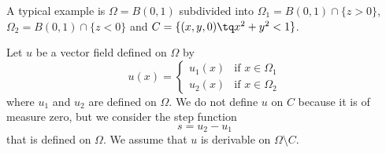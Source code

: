 A typical example is \( \Omega=B(0,1)\) subdivided into \( \Omega_1=B(0,1)\cap\{ z>0 \}\), \( \Omega_2=B(0,1)\cap \{ z<0 \}\) and \( C=\{ (x,y,0)\tq x^2+y^2<1 \}\).


Let \( u\) be a vector field defined on \( \Omega\) by
\begin{equation}
    u(x)=\begin{cases}
        u_1(x)    &   \text{if } x\in \Omega_1\\
        u_2(x)    &    \text{if } x\in \Omega_2
    \end{cases}
\end{equation}
where \( u_1\) and \( u_2\) are defined on \( \Omega\). We do not define \( u\) on \( C\) because it is of measure zero, but we consider the step function
\begin{equation}
    s=u_2-u_1
\end{equation}
that is defined on \( \Omega\). We assume that \( u\) is derivable on \( \Omega\setminus C\).

